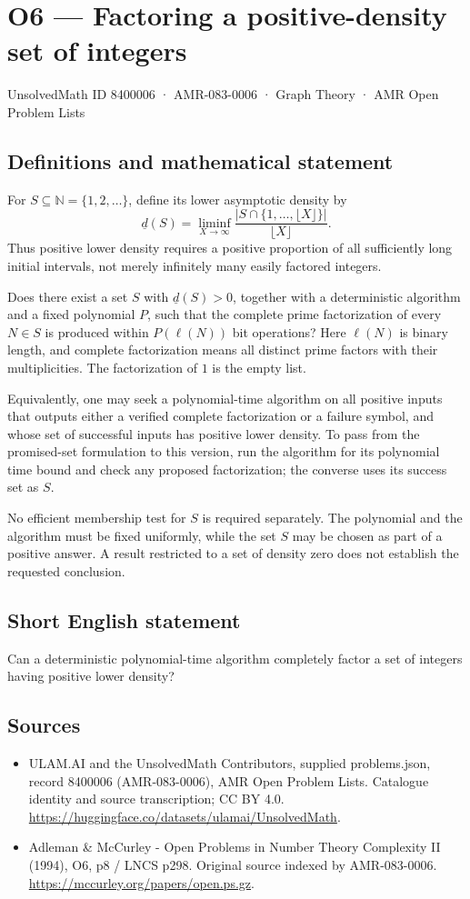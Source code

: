 \documentclass[11pt,a4paper]{article}
\begin{document}
\section*{O6 — Factoring a positive-density set of integers}\label{8400006}
{\small UnsolvedMath ID 8400006 · AMR-083-0006 · Graph Theory · AMR Open Problem Lists}
\subsection{Definitions and mathematical statement}
For $S\subseteq\mathbb N=\{1,2,\ldots\}$, define its lower asymptotic density by
\[
\underline d(S)=\liminf_{X\to\infty}\frac{|S\cap\{1,\ldots,\lfloor X\rfloor\}|}{\lfloor X\rfloor}.
\]
Thus positive lower density requires a positive proportion of all sufficiently long initial intervals, not merely infinitely many easily factored integers.

Does there exist a set $S$ with $\underline d(S)>0$, together with a deterministic algorithm and a fixed polynomial $P$, such that the complete prime factorization of every $N\in S$ is produced within $P(\ell(N))$ bit operations? Here $\ell(N)$ is binary length, and complete factorization means all distinct prime factors with their multiplicities. The factorization of $1$ is the empty list.

Equivalently, one may seek a polynomial-time algorithm on all positive inputs that outputs either a verified complete factorization or a failure symbol, and whose set of successful inputs has positive lower density. To pass from the promised-set formulation to this version, run the algorithm for its polynomial time bound and check any proposed factorization; the converse uses its success set as $S$.

No efficient membership test for $S$ is required separately. The polynomial and the algorithm must be fixed uniformly, while the set $S$ may be chosen as part of a positive answer. A result restricted to a set of density zero does not establish the requested conclusion.
\subsection{Short English statement}
Can a deterministic polynomial-time algorithm completely factor a set of integers having positive lower density?
\subsection{Sources}
\begin{itemize}
\item[S1] ULAM.AI and the UnsolvedMath Contributors, supplied problems.json, record 8400006 (AMR-083-0006), AMR Open Problem Lists. Catalogue identity and source transcription; CC BY 4.0.
\url{https://huggingface.co/datasets/ulamai/UnsolvedMath}.
\item[S2] Adleman \& McCurley - Open Problems in Number Theory Complexity II (1994), O6, p8 / LNCS p298. Original source indexed by AMR-083-0006.
\url{https://mccurley.org/papers/open.ps.gz}.
\end{itemize}
\end{document}
